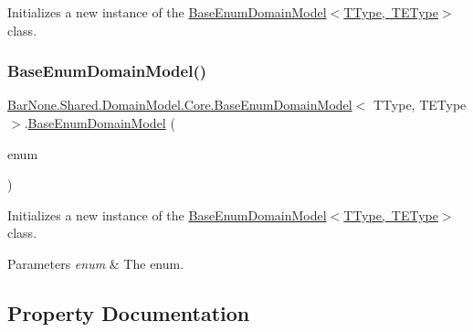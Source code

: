 Initializes a new instance of the \mbox{\hyperlink{class_bar_none_1_1_shared_1_1_domain_model_1_1_core_1_1_base_enum_domain_model_aaeae84370e53d1611ee9e48d671c6194}{Base\+Enum\+Domain\+Model$<$\+T\+Type, T\+E\+Type$>$}} class. 

\mbox{\label{class_bar_none_1_1_shared_1_1_domain_model_1_1_core_1_1_base_enum_domain_model_a24524d7c9a156971b443605f3cf7c28d}} 
\subsubsection{\texorpdfstring{Base\+Enum\+Domain\+Model()}{BaseEnumDomainModel()}\hspace{0.1cm}{\footnotesize\ttfamily [2/2]}}
{\footnotesize\ttfamily \mbox{\hyperlink{class_bar_none_1_1_shared_1_1_domain_model_1_1_core_1_1_base_enum_domain_model}{Bar\+None.\+Shared.\+Domain\+Model.\+Core.\+Base\+Enum\+Domain\+Model}}$<$ T\+Type, T\+E\+Type $>$.\mbox{\hyperlink{class_bar_none_1_1_shared_1_1_domain_model_1_1_core_1_1_base_enum_domain_model}{Base\+Enum\+Domain\+Model}} (\begin{DoxyParamCaption}\item[{T\+E\+Type @}]{enum }\end{DoxyParamCaption})}



Initializes a new instance of the \mbox{\hyperlink{class_bar_none_1_1_shared_1_1_domain_model_1_1_core_1_1_base_enum_domain_model_aaeae84370e53d1611ee9e48d671c6194}{Base\+Enum\+Domain\+Model$<$\+T\+Type, T\+E\+Type$>$}} class. 


\begin{DoxyParams}{Parameters}
{\em enum} & The enum.\\
\hline
\end{DoxyParams}


\subsection{Property Documentation}
\mbox{\label{class_bar_none_1_1_shared_1_1_domain_model_1_1_core_1_1_base_enum_domain_model_a0884a9791405695e2def5f2188004128}} 
